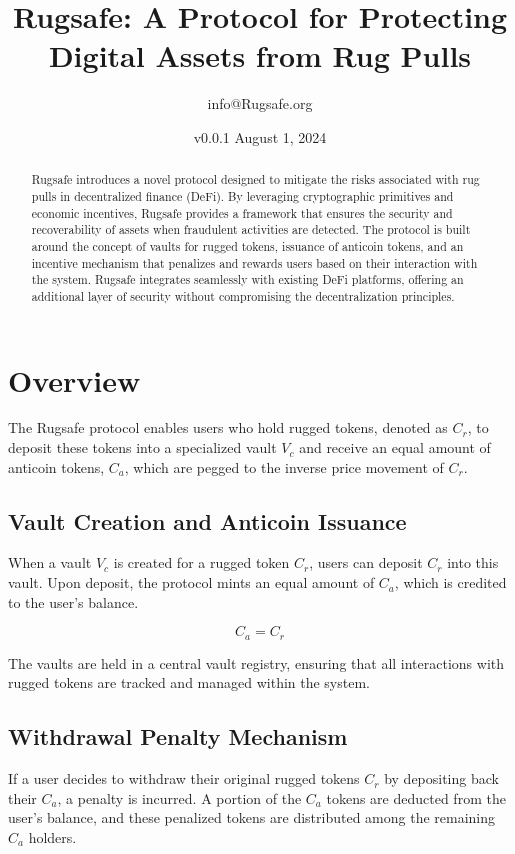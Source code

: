 \documentclass{article}
\title{Rugsafe: A Protocol for Protecting Digital Assets from Rug Pulls}
\author{info@Rugsafe.org}
\date{v0.0.1 August 1, 2024}
\begin{document}
\maketitle

\begin{abstract}
Rugsafe introduces a novel protocol designed to mitigate the risks associated with rug pulls in decentralized finance (DeFi). By leveraging cryptographic primitives and economic incentives, Rugsafe provides a framework that ensures the security and recoverability of assets when fraudulent activities are detected. The protocol is built around the concept of vaults for rugged tokens, issuance of anticoin tokens, and an incentive mechanism that penalizes and rewards users based on their interaction with the system. Rugsafe integrates seamlessly with existing DeFi platforms, offering an additional layer of security without compromising the decentralization principles.
\end{abstract}



\section{Overview}

The Rugsafe protocol enables users who hold rugged tokens, denoted as $C_r$, to deposit these tokens into a specialized vault $V_c$ and receive an equal amount of anticoin tokens, $C_a$, which are pegged to the inverse price movement of $C_r$.

\subsection{Vault Creation and Anticoin Issuance}
When a vault $V_c$ is created for a rugged token $C_r$, users can deposit $C_r$ into this vault. Upon deposit, the protocol mints an equal amount of $C_a$, which is credited to the user's balance.

\begin{equation}
C_a = C_r
\end{equation}

The vaults are held in a central vault registry, ensuring that all interactions with rugged tokens are tracked and managed within the system.

\subsection{Withdrawal Penalty Mechanism}
If a user decides to withdraw their original rugged tokens $C_r$ by depositing back their $C_a$, a penalty is incurred. A portion of the $C_a$ tokens are deducted from the user's balance, and these penalized tokens are distributed among the remaining $C_a$ holders.
\end{document}
